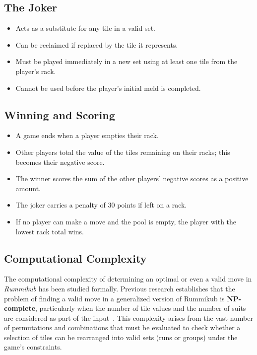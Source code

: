 \documentclass[11pt,letterpaper]{article}
\begin{document}
\subsection*{The Joker}
\begin{itemize}
    \item Acts as a substitute for any tile in a valid set.
    \item Can be reclaimed if replaced by the tile it represents.
    \item Must be played immediately in a new set using at least one tile from the player’s rack.
    \item Cannot be used before the player's initial meld is completed.
\end{itemize}

\subsection*{Winning and Scoring}
\begin{itemize}
    \item A game ends when a player empties their rack.
    \item Other players total the value of the tiles remaining on their racks; this becomes their negative score.
    \item The winner scores the sum of the other players’ negative scores as a positive amount.
    \item The joker carries a penalty of 30 points if left on a rack.
    \item If no player can make a move and the pool is empty, the player with the lowest rack total wins.
\end{itemize}

\subsection*{Computational Complexity}

The computational complexity of determining an optimal or even a valid move in \textit{Rummikub} has been studied formally. Previous research establishes that the problem of finding a valid move in a generalized version of Rummikub is \textbf{NP-complete}, particularly when the number of tile values and the number of suits are considered as part of the input~\cite{rummikub_complexity}. This complexity arises from the vast number of permutations and combinations that must be evaluated to check whether a selection of tiles can be rearranged into valid sets (runs or groups) under the game’s constraints.
\end{document}
